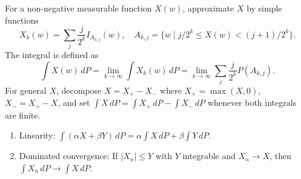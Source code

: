For a non-negative measurable function $X(w)$, approximate $X$ by simple functions
$$X_k(w) = \sum_j \frac{j}{2^k} I_{A_{k,j}}(w), \quad A_{k,j} = \{w \mid j/2^k \leq X(w) < (j+1)/2^k\}.$$
The integral is defined as
$$\int X(w) \, dP = \lim_{k \to \infty} \int X_k(w) \, dP = \lim_{k \to \infty} \sum_j \frac{j}{2^k} P(A_{k,j}).$$
For general $X$, decompose $X = X_+ - X_-$ where $X_+ = \max(X,0)$, $X_- = X_+ - X$, and set $\int X \, dP = \int X_+ \, dP - \int X_- \, dP$ whenever both integrals are finite.

\begin{enumerate}
\item Linearity: $\int (\alpha X + \beta Y) \, dP = \alpha \int X \, dP + \beta \int Y \, dP$.
\item Dominated convergence: If $|X_n| \leq Y$ with $Y$ integrable and $X_n \to X$, then $\int X_n \, dP \to \int X \, dP$.
\end{enumerate}
